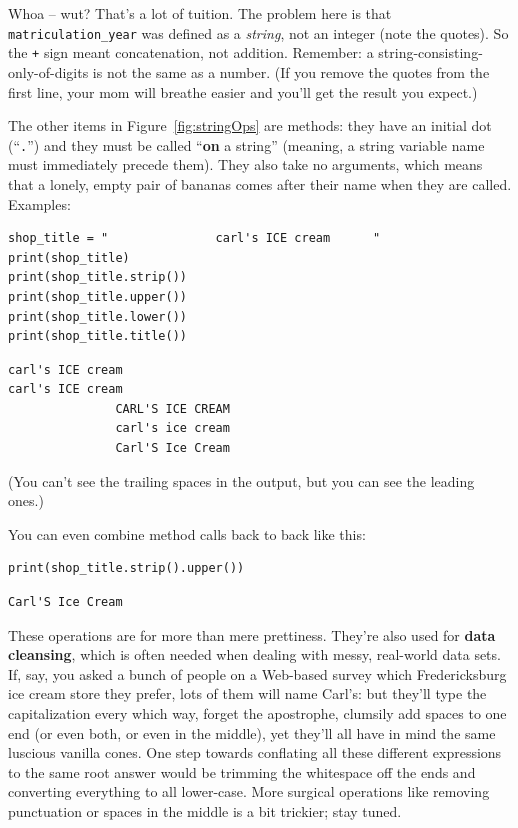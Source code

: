 Whoa -- wut? That's a lot of tuition. The problem here is that
\texttt{matriculation\_year} was defined as a \textit{string}, not an integer
(note the quotes). So the \texttt{+} sign meant concatenation, not addition.
Remember: a string-consisting-only-of-digits is not the same as a number. (If
you remove the quotes from the first line, your mom will breathe easier and
you'll get the result you expect.)

The other items in Figure~\ref{fig:stringOps} are methods: they have an initial
dot (``\texttt{.}'') and they must be called ``\textbf{on} a string'' (meaning,
a string variable name must immediately precede them). They also take no
arguments, which means that a lonely, empty pair of bananas comes after their
name when they are called. Examples:

\begin{Verbatim}[fontsize=\small,samepage=true,frame=single,framesep=3mm]
shop_title = "               carl's ICE cream      "
print(shop_title)
print(shop_title.strip())
print(shop_title.upper())
print(shop_title.lower())
print(shop_title.title())
\end{Verbatim}

\begin{Verbatim}[fontsize=\small,samepage=true,frame=leftline,framesep=5mm,framerule=1mm]
               carl's ICE cream         
carl's ICE cream
               CARL'S ICE CREAM         
               carl's ice cream         
               Carl'S Ice Cream         
\end{Verbatim}

(You can't see the trailing spaces in the output, but you can see the leading
ones.)

You can even combine method calls back to back like this:

\begin{Verbatim}[fontsize=\small,samepage=true,frame=single,framesep=3mm]
print(shop_title.strip().upper())
\end{Verbatim}

\begin{Verbatim}[fontsize=\small,samepage=true,frame=leftline,framesep=5mm,framerule=1mm]
Carl'S Ice Cream
\end{Verbatim}

These operations are for more than mere prettiness. They're also used for
\textbf{data cleansing}, which is often needed when dealing with messy,
real-world data sets. If, say, you asked a bunch of people on a Web-based
survey which Fredericksburg ice cream store they prefer, lots of them will name
Carl's: but they'll type the capitalization every which way, forget the
apostrophe, clumsily add spaces to one end (or even both, or even in the
middle), yet they'll all have in mind the same luscious vanilla cones. One step
towards conflating all these different expressions to the same root answer
would be trimming the whitespace off the ends and converting everything to all
lower-case. More surgical operations like removing punctuation or spaces in the
middle is a bit trickier; stay tuned.

